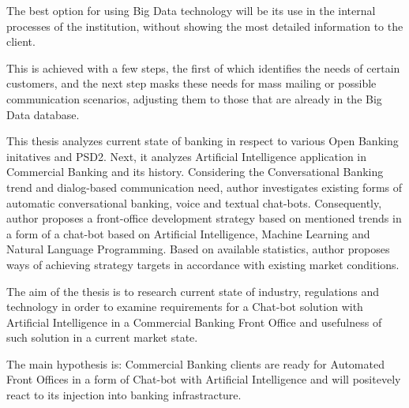 The best option for using Big Data technology will be its use in the internal processes of the institution, 
without showing the most detailed information to the client.

This is achieved with a few steps, the first of which identifies the needs of certain customers,
and the next step masks these needs for mass mailing or possible communication scenarios, 
adjusting them to those that are already in the Big Data database. 

This thesis analyzes current state of banking in respect to various Open Banking initatives and PSD2.
Next, it analyzes Artificial Intelligence application in Commercial Banking and its history.
Considering the Conversational Banking trend and dialog-based communication need, author investigates existing forms of automatic conversational banking, voice and textual chat-bots.
Consequently, author proposes a front-office development strategy based on mentioned trends in a form of a chat-bot based on Artificial Intelligence, Machine Learning and Natural Language Programming.
Based on available statistics, author proposes ways of achieving strategy targets in accordance with existing market conditions.

The aim of the thesis is to research current state of industry, regulations and technology in order to examine requirements for a Chat-bot solution with Artificial Intelligence in a Commercial Banking Front Office and usefulness of such solution in a current market state.

The main hypothesis is: Commercial Banking clients are ready for Automated Front Offices in a form of Chat-bot with Artificial Intelligence and will positevely react to its injection into banking infrastracture.
